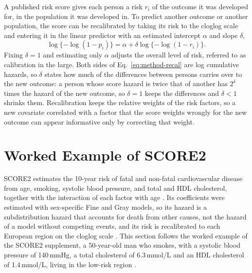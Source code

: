 A published risk score gives each person a risk $r_i$ of the outcome it was developed for, in the population it was developed in.
To predict another outcome or another population, the score can be recalibrated by taking its risk to the cloglog scale and entering it in the linear predictor with an estimated intercept $\alpha$ and slope $\delta$,
\begin{equation}
  \log\{-\log(1 - p_i)\} = \alpha + \delta \log\{-\log(1 - r_i)\}.
  \label{eq:method-recal}
\end{equation}
Fixing $\delta = 1$ and estimating only $\alpha$ adjusts the overall level of risk, referred to as calibration in the large.
Both sides of Eq.~\eqref{eq:method-recal} are log cumulative hazards, so $\delta$ states how much of the differences between persons carries over to the new outcome: a person whose score hazard is twice that of another has $2^{\delta}$ times the hazard of the new outcome, so $\delta = 1$ keeps the differences and $\delta < 1$ shrinks them.
Recalibration keeps the relative weights of the risk factors, so a new covariate correlated with a factor that the score weights wrongly for the new outcome can appear informative only by correcting that weight.

\section{Worked Example of SCORE2}
\label{app:score2-example}

SCORE2 estimates the 10-year risk of fatal and non-fatal cardiovascular disease from age, smoking, systolic blood pressure, and total and HDL cholesterol, together with the interaction of each factor with age \cite{score2_2021}.
Its coefficients were estimated with sex-specific Fine and Gray models, so its hazard is a subdistribution hazard that accounts for death from other causes, not the hazard of a model without competing events, and its risk is recalibrated to each European region on the cloglog scale \cite[Supplementary Methods, Box~1 and Box~6]{score2_2021}.
This section follows the worked example of the SCORE2 supplement, a 50-year-old man who smokes, with a systolic blood pressure of 140\,mmHg, a total cholesterol of 6.3\,mmol/L and an HDL cholesterol of 1.4\,mmol/L, living in the low-risk region \cite[Supplementary Methods, Table~4]{score2_2021}.


